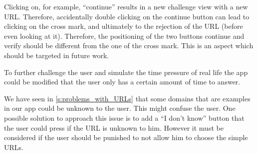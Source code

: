 \begin{description}[leftmargin=0cm]
Clicking on, for example, ``continue'' results in a new challenge view with a new URL.
Therefore, accidentally double clicking on the continue button can lead to clicking on the cross mark, and ultimately to the rejection of the URL (before even looking at it).
Therefore, the positioning of the two buttons continue and verify should be different from the one of the cross mark.
This is an aspect which should be targeted in future work. 
\item[Time Pressure:] To further challenge the user and simulate the time pressure of real life the app could be modified that the user only has a certain amount of time to answer.
\item[Unkown Services:] We have seen in \ref{s:problems_with_URLs} that some domains that are examples in our app could be unknown to the user. This might confuse the user. One possible solution to approach this issue is to add a ``I don't know'' button that the user could press if the URL is unknown to him. However it must be considered if the user should be punished to not allow him to choose the simple URLs.
\end{description}



